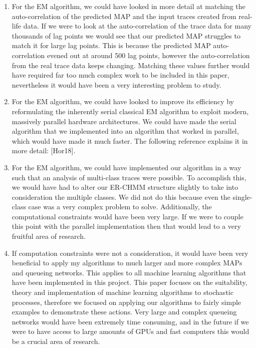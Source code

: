 \documentclass[a4paper,11pt,titlepage]{article}
\begin{document}
\begin{enumerate}
    \item For the EM algorithm, we could have looked in more detail at matching the auto-correlation of the predicted MAP and the input traces created from real-life data. If we were to look at the auto-correlation of the trace data for many thousands of lag points we would see that our predicted MAP struggles to match it for large lag points. This is because the predicted MAP auto-correlation evened out at around 500 lag points, however the auto-correlation from the real trace data keeps changing. Matching these values further would have required far too much complex work to be included in this paper, nevertheless it would have been a very interesting problem to study. 
    \item For the EM algorithm, we could have looked to improve its efficiency by reformulating the inherently serial classical EM algorithm to exploit modern, massively parallel hardware architectures. We could have made the serial algorithm that we implemented into an algorithm that worked in parallel, which would have made it much faster. The following reference explains it in more detail: [Hor18]. 
    \item For the EM algorithm, we could have implemented our algorithm in a way such that an analysis of multi-class traces were possible. To accomplish this, we would have had to alter our ER-CHMM structure slightly to take into consideration the multiple classes. We did not do this because even the single-class case was a very complex problem to solve. Additionally, the computational constraints would have been very large. If we were to couple this point with the parallel implementation then that would lead to a very fruitful area of research. 
    \item If computation constraints were not a consideration, it would have been very beneficial to apply my algorithms to much larger and more complex MAPs and queueing networks. This applies to all machine learning algorithms that have been implemented in this project. This paper focuses on the suitability, theory and implementation of machine learning algorithms to stochastic processes, therefore we focused on applying our algorithms to fairly simple examples to demonstrate these actions. Very large and complex queueing networks would have been extremely time consuming, and in the future if we were to have access to large amounts of GPUs and fast computers this would be a crucial area of research. 

\end{enumerate}
\end{document}
